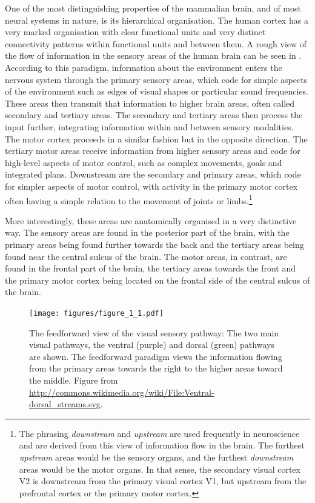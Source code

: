 One of the most distinguishing properties of the mammalian brain, and of most neural systems in nature, is its hierarchical organisation. 
The human cortex has a very marked organisation with clear functional units and very distinct connectivity patterns within functional units and between
them. A rough view of the flow of information in the sensory areas of the human brain can be seen in 
. According to this paradigm, information about the environment enters the
nervous system through the primary sensory areas, which code for simple aspects of the environment such as edges of visual shapes or particular sound frequencies.
These areas then transmit that information to higher brain areas, often called secondary and tertiary areas.
The secondary and tertiary areas then process the input further, integrating information within and between sensory modalities. The motor cortex proceeds in a similar
fashion but in the opposite direction. The tertiary motor areas receive information from higher sensory areas and code for high-level aspects of motor control, such as 
complex movements, goals and integrated plans.
Downstream are the secondary and primary areas, which code for simpler aspects of motor control, with activity in the primary motor cortex often having a simple 
relation to the movement of joints or limbs.\footnote{The phrasing \emph{downstream} and \emph{upstream} are used frequently in neuroscience and are derived from 
this view of information flow in the brain. The furthest \emph{upstream} areas would be the sensory organs, and the furthest \emph{downstream} areas would be the 
motor organs. In
that sense, the secondary visual cortex V2 is downstream from the primary visual cortex V1, but upstream from the prefrontal cortex or the primary motor cortex.}
\par

More interestingly, these areas are anatomically organised in a very distinctive way. The sensory areas are found in the posterior part of the brain, with the primary areas
being found further towards the back and the tertiary areas being found near the central sulcus of the brain. The motor areas, in contrast, are found in the frontal part of
the brain, the tertiary areas towards the front and the primary motor cortex being located on the frontal side of the central sulcus of the brain.\par

\begin{figure}
\caption[The feedforward paradigm.]{The feedforward view of the visual sensory pathway: The two main visual pathways, the ventral (purple) and dorsal (green) pathways are shown. The feedforward
paradigm views the information flowing from the primary areas towards the right to the higher areas toward the middle. Figure from \url{http://commons.wikimedia.org/wiki/File:Ventral-dorsal_streams.svg}.}
\label{fig:feedforward_brain}
\texttt{[image: figures/figure\_1\_1.pdf]}
\end{figure}

